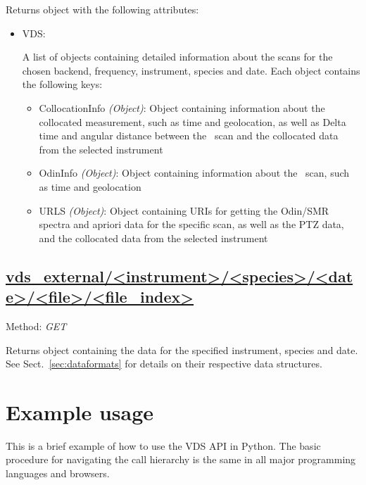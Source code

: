 Returns object with the following attributes:
\begin{itemize}
    \item VDS:

        A list of objects containing detailed information about the scans for
        the chosen backend, frequency, instrument, species and date.
        Each object contains the following keys:

        \begin{itemize}
            \item CollocationInfo \emph{(Object)}: Object containing
                information about the collocated measurement, such as time and
                geolocation, as well as Delta time and angular distance between
                the \smr\ scan and the collocated data from the selected
                instrument
            \item OdinInfo \emph{(Object)}: Object containing information
                about the \smr\ scan, such as time and geolocation
            \item URLS \emph{(Object)}: Object containing URIs for getting the
            Odin/SMR spectra and apriori data for the specific scan, as
            well as the PTZ data, and the collocated data from the selected
            instrument
        \end{itemize}
\end{itemize}


\subsection{\url{vds_external/<instrument>/<species>/<date>/<file>/<file_index>}}
Method: \emph{GET}

Returns object containing the data for the specified instrument, species and
date. See Sect.~\ref{sec:dataformats} for details on their respective data
structures.

\section{Example usage}
\label{sec:api_usage}
This is a brief example of how to use the VDS API in Python. The basic
procedure for navigating the call hierarchy is the same in all major
programming languages and browsers.


